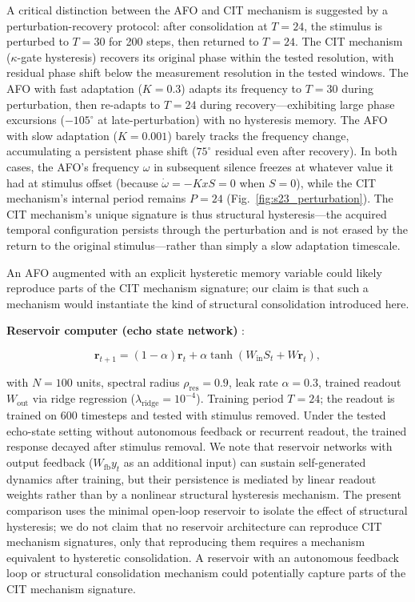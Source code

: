 \documentclass[12pt,a4paper]{article}
\begin{document}
A critical distinction between the AFO and CIT mechanism is suggested by a perturbation-recovery protocol: after consolidation at $T=24$, the stimulus is perturbed to $T=30$ for 200 steps, then returned to $T=24$. The CIT mechanism ($\kappa$-gate hysteresis) recovers its original phase within the tested resolution, with residual phase shift below the measurement resolution in the tested windows. The AFO with fast adaptation ($K=0.3$) adapts its frequency to $T=30$ during perturbation, then re-adapts to $T=24$ during recovery---exhibiting large phase excursions ($-105^\circ$ at late-perturbation) with no hysteresis memory. The AFO with slow adaptation ($K=0.001$) barely tracks the frequency change, accumulating a persistent phase shift ($75^\circ$ residual even after recovery). In both cases, the AFO\textquoteright s frequency $\omega$ in subsequent silence freezes at whatever value it had at stimulus offset (because $\dot{\omega} = -KxS = 0$ when $S=0$), while the CIT mechanism\textquoteright s internal period remains $P=24$ (Fig.~\ref{fig:s23_perturbation}). The CIT mechanism\textquoteright s unique signature is thus structural hysteresis---the acquired temporal configuration persists through the perturbation and is not erased by the return to the original stimulus---rather than simply a slow adaptation timescale.



An AFO augmented with an explicit hysteretic memory variable could likely reproduce parts of the CIT mechanism signature; our claim is that such a mechanism would instantiate the kind of structural consolidation introduced here.



\textbf{Reservoir computer (echo state network)} \cite{jaeger2004harnessing}:

\begin{equation}

\mathbf{r}_{t+1} = (1-\alpha)\mathbf{r}_t + \alpha\tanh(W_{\mathrm{in}}S_t + W\mathbf{r}_t),

\end{equation}

with $N=100$ units, spectral radius $\rho_{\mathrm{res}} = 0.9$, leak rate $\alpha = 0.3$, trained readout $W_{\mathrm{out}}$ via ridge regression ($\lambda_{\mathrm{ridge}}=10^{-4}$). Training period $T=24$; the readout is trained on 600 timesteps and tested with stimulus removed. Under the tested echo-state setting without autonomous feedback or recurrent readout, the trained response decayed after stimulus removal. We note that reservoir networks with output feedback ($W_{\mathrm{fb}}y_t$ as an additional input) can sustain self-generated dynamics after training, but their persistence is mediated by linear readout weights rather than by a nonlinear structural hysteresis mechanism. The present comparison uses the minimal open-loop reservoir to isolate the effect of structural hysteresis; we do not claim that no reservoir architecture can reproduce CIT mechanism signatures, only that reproducing them requires a mechanism equivalent to hysteretic consolidation. A reservoir with an autonomous feedback loop or structural consolidation mechanism could potentially capture parts of the CIT mechanism signature.
\end{document}

